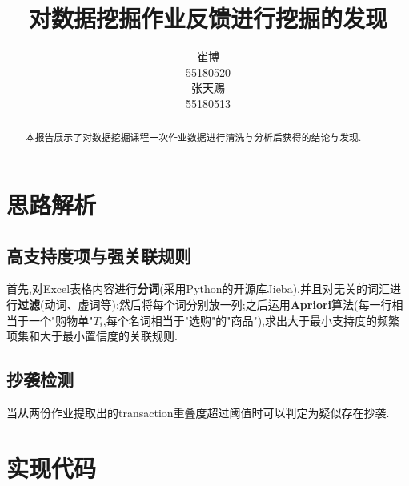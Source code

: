 \documentclass[lang=cn,11pt,a4paper,cite=authoryear]{elegantpaper}
\title{对数据挖掘作业反馈进行挖掘的发现}
\author{崔\quad{}博\\55180520\\张天赐\\55180513}
\date{\zhtoday}
\begin{document}
\maketitle

\begin{abstract}
本报告展示了对数据挖掘课程一次作业数据进行清洗与分析后获得的结论与发现.
\end{abstract}
\section{思路解析}
\subsection{高支持度项与强关联规则}
首先,对Excel表格内容进行\textbf{分词}(采用Python的开源库Jieba),并且对无关的词汇进行\textbf{过滤}(动词、虚词等);然后将每个词分别放一列;之后运用\textbf{Apriori}算法(每一行相当于一个"购物单"$T_{i}$,每个名词相当于"选购"的"商品"),求出大于最小支持度的频繁项集和大于最小置信度的关联规则.
\subsection{抄袭检测}
当从两份作业提取出的transaction重叠度超过阈值时可以判定为疑似存在抄袭.
\section{实现代码}
\end{document}
